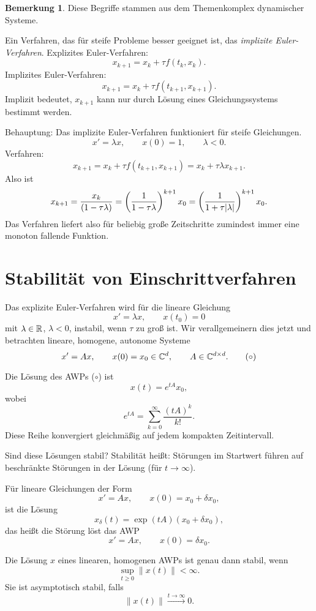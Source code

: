 \documentclass[
 a4paper,
 12pt,
 parskip=half
 ]{scrreprt}
\theoremstyle{plain}
\theoremstyle{definition}
\numberwithin{rmrk}{chapter}
\numberwithin{defn}{chapter}
\numberwithin{exmp}{chapter}
\numberwithin{prgp}{subsection}
\newtheorem*{rmrk*}{Bemerkung}
\numberwithin{equation}{chapter}
\begin{document}
\begin{rmrk*}
  Diese Begriffe stammen aus dem Themenkomplex dynamischer Systeme.
\end{rmrk*}

Ein Verfahren, das für steife Probleme besser geeignet ist, das \emph{implizite
  Euler-Verfahren}.
Explizites Euler-Verfahren:
\[ x_{k+1} = x_k + \tau f(t_k, x_k). \]
Implizites Euler-Verfahren:
\[ x_{k+1} = x_k + \tau f(t_{k+1}, x_{k+1}). \]
Implizit bedeutet, $x_{k+1}$ kann nur durch Lösung eines Gleichungssystems
bestimmt werden.

Behauptung: Das implizite Euler-Verfahren funktioniert für steife Gleichungen.
\[ x' = \lambda x, \qquad x(0) = 1, \qquad \lambda < 0. \]
Verfahren:
\[ x_{k+1} = x_k + \tau f(t_{k+1}, x_{k+1}) = x_k + \tau \lambda x_{k+1}. \]
Also ist
\[ x_{k+1} = \frac{x_k}{(1-\tau \lambda)}
  = \left( \frac{1}{1-\tau \lambda} \right)^{k+1} x_0
  = \left( \frac{1}{1 + \tau |\lambda|} \right)^{k+1} x_0. \]
Das Verfahren liefert also für beliebig große Zeitschritte zumindest immer eine
monoton fallende Funktion.

\section{Stabilität von Einschrittverfahren}
Das explizite Euler-Verfahren wird für die lineare Gleichung
\[ x' = \lambda x, \qquad x(t_0) = 0 \]
mit $\lambda \in \mathbb{R}$, $\lambda < 0$, instabil, wenn $\tau$ zu groß ist. Wir
verallgemeinern dies jetzt und betrachten lineare, homogene, autonome Systeme
\[ x' = Ax, \qquad x(0) = x_0 \in \mathbb{C}^d, \qquad A \in \mathbb{C}^{d \times d}.
  \tag{$\circ$} \]

\begin{thm} %
  Die Lösung des AWPs ($\circ$)  ist
  \[ x(t) = e^{tA} x_0, \]
  wobei
  \[ e^{tA} = \sum_{k=0}^\infty \frac{(tA)^k}{k!}. \]
  Diese Reihe konvergiert gleichmäßig auf jedem kompakten Zeitintervall.
\end{thm}

Sind diese Lösungen stabil? Stabilität heißt: Störungen im Startwert führen auf
beschränkte Störungen in der Lösung (für $t \to \infty$).

Für lineare Gleichungen der Form
\[ x' = Ax, \qquad x(0) = x_0 + \delta x_0, \]
ist die Lösung
\[ x_\delta(t) = \exp( tA )(x_0 + \delta x_0), \]
das heißt die Störung löst das AWP
\[ x' = Ax, \qquad x(0) = \delta x_0. \]

\begin{lem} %
  Die Lösung $x$ eines linearen, homogenen AWPs ist genau dann stabil, wenn
  \[ \sup_{t \ge 0} \| x(t) \| < \infty. \]
  Sie ist asymptotisch stabil, falls
  \[ \| x(t) \| \xrightarrow{t \to \infty} 0. \]
\end{lem}
\end{document}
